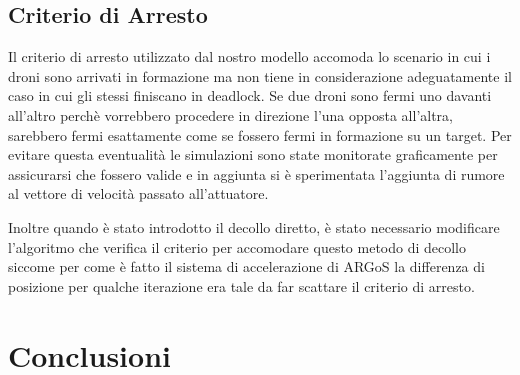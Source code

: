 \documentclass[a4paper,11pt,oneside, table]{article}
\begin{document}
\subsection{Criterio di Arresto}

Il criterio di arresto utilizzato dal nostro modello accomoda lo scenario in cui i droni sono arrivati in formazione ma non tiene in considerazione adeguatamente il caso in cui gli stessi finiscano in deadlock.
Se due droni sono fermi uno davanti all'altro perch\`e vorrebbero procedere in direzione l'una opposta all'altra, sarebbero fermi esattamente come se fossero fermi in formazione su un target.
Per evitare questa eventualit\`a le simulazioni sono state monitorate graficamente per assicurarsi che fossero valide e in aggiunta si \`e sperimentata l'aggiunta di rumore al vettore di velocit\`a passato all'attuatore.

Inoltre quando \`e stato introdotto il decollo diretto, \`e stato necessario modificare l'algoritmo che verifica il criterio per accomodare questo metodo di decollo siccome per come \`e fatto il sistema di accelerazione di ARGoS la differenza di posizione per qualche iterazione era tale da far scattare il criterio di arresto.

\section{Conclusioni}

\printbibliography[title={Bibliografia}]
\end{document}
